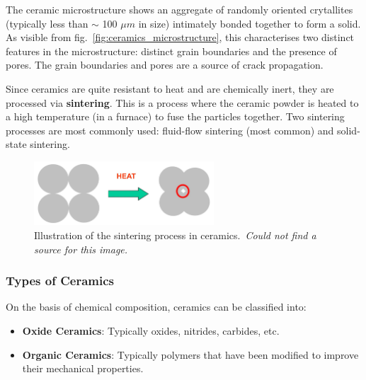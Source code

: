 \documentclass[12pt]{article}
\begin{document}
The ceramic microstructure shows an aggregate of randomly oriented crytallites
(typically less than $\sim$ 100 $\mu m$ in size) intimately bonded together to
form a solid. As visible from fig.~\ref{fig:ceramics_microstructure}, this
characterises two distinct features in the microstructure: distinct grain
boundaries and the presence of pores. The grain boundaries and pores are a
source of crack propagation.

Since ceramics are quite resistant to heat and are chemically inert, they are
processed via \textbf{sintering}. This is a process where the ceramic powder is
heated to a high temperature (in a furnace) to fuse the particles together. Two
sintering processes are most commonly used: fluid-flow sintering (most common)
and solid-state sintering.

\begin{figure}[htbp]
    \centering
    \includegraphics[width=0.6\textwidth]{figures/chapter_2/sintering.jpg}
    \caption{Illustration of the sintering process in ceramics.~\textit{Could not find a source for this image.}}\label{fig:sintering}
\end{figure}

\subsubsection{Types of Ceramics}
On the basis of chemical composition, ceramics can be classified into:
\begin{itemize}
    \item \textbf{Oxide Ceramics}: Typically oxides, nitrides, carbides, etc.
    \item \textbf{Organic Ceramics}: Typically polymers that have been modified to improve their mechanical properties.
\end{itemize}
\end{document}
